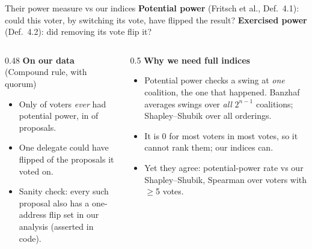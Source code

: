 \documentclass[aspectratio=169,11pt]{beamer}
\begin{document}
\begin{frame}{Their power measure vs our indices}
  \small
  \textbf{Potential power} (Fritsch et al., Def.\ 4.1): could this voter, by switching its vote, have flipped the result? \textbf{Exercised power} (Def.\ 4.2): did removing its vote flip it?
  \vspace{0.4em}
  \begin{columns}[T]
  \begin{column}{0.48\textwidth}
    \textbf{On our data} (Compound rule, with quorum)
    \begin{itemize}
      \item Only \PotVoters{} of \PotVotersTotal{} voters \emph{ever} had potential power, in \PotProposals{} of \NDecided{} proposals.
      \item One delegate could have flipped \PotTop{} of the \PotTopVoted{} proposals it voted on.
      \item Sanity check: every such proposal also has a one-address flip set in our analysis (asserted in code).
    \end{itemize}
  \end{column}
  \begin{column}{0.5\textwidth}
    \textbf{Why we need full indices}
    \begin{itemize}
      \item Potential power checks a swing at \emph{one} coalition, the one that happened. Banzhaf averages swings over \emph{all} $2^{n-1}$ coalitions; Shapley--Shubik over all orderings.
      \item It is 0 for most voters in most votes, so it cannot rank them; our indices can.
      \item Yet they agree: potential-power rate vs our Shapley--Shubik, Spearman \PotSpearman{} over \PotActive{} voters with $\ge$5 votes.
    \end{itemize}
  \end{column}
  \end{columns}
\end{frame}
\end{document}
